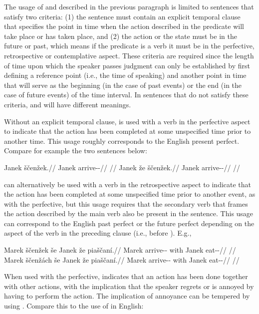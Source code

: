 The usage of  and  described in the previous paragraph is
limited to sentences that satisfy two criteria: (1) the sentence must contain an
explicit temporal clause that specifies the point in time when the action
described in the predicate will take place or has taken place, and (2) the
action or the state must be in the future or past, which means if the predicate
is a verb it must be in the perfective, retrospective or contemplative aspect.
These criteria are required since the length of time upon which the speaker
passes judgment can only be established by first defining a reference point
(i.e., the time of speaking) and another point in time that will serve as the
beginning (in the case of past events) or the end (in the case of future events)
of the time interval. In sentences that do not satisfy these criteria, 
and  will have different meanings.

Without an explicit temporal clause,  is used with a verb in the
perfective aspect to indicate that the action has been completed at some
unspecified time prior to another time. This usage roughly corresponds to the
English present perfect. Compare for example the two sentences below:

\pex
\a
\begingl
	\gla Janek ščenžek.//
	\glb Janek arrive-\Av{}-\Pf{}//
	\glft {}//
\endgl
\a
\begingl
	\gla Janek že ščenžek.//
	\glb Janek \Pfv{} arrive-\Av{}-\Pf{}//
	\glft {}//
\endgl
\xe

 can alternatively be used with a verb in the retrospective aspect to
indicate that the action has been completed at some unspecified time prior to
another event, as with the perfective, but this usage requires that the
secondary verb that frames the action described by the main verb also be present
in the sentence. This usage can correspond to the English past perfect or the
future perfect depending on the aspect of the verb in the preceding clause
(i.e., before ). E.g.,

\pex
\a
\begingl
	\gla Marek ščenžek še Janek že piaščaní.//
	\glb Marek arrive-\Av{}-\Pf{} with Janek \Pfv{} eat-\Av{}-\Ret{}//
	\glft {}//
\endgl
\a
\begingl
	\gla Marek ščenžách še Janek že piaščaní.//
	\glb Marek arrive-\Av{}-\Ctp{} with Janek \Pfv{} eat-\Av{}-\Ret{}//
	\glft {}//
\endgl
\xe

When used with the perfective,  indicates that an action has been done
together with other actions, with the implication that the speaker regrets or is
annoyed by having to perform the action. The implication of annoyance can be
tempered by using . Compare this to the use of  in English:

